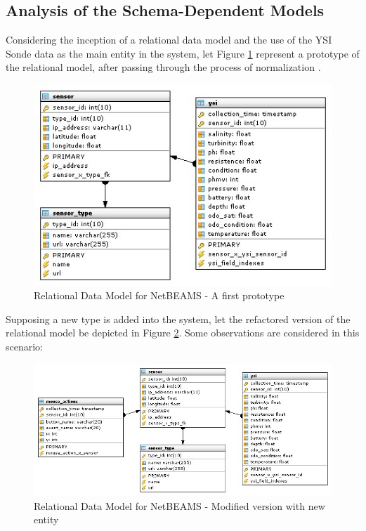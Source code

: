 \subsection{Analysis of the Schema-Dependent Models}

Considering the inception of a relational data model \cite{relational-model}
and the use of the YSI Sonde data as the main entity in the system, let Figure
\ref{fig:Relational-Model-Original} represent a prototype of the relational 
model, after passing through the process of normalization
\cite{db-normalization}.

\begin{figure}
  \centering
  \includegraphics[scale=0.5]{../diagrams/Relational-Model-Original}
  \caption{Relational Data Model for NetBEAMS - A first prototype}
  \label{fig:Relational-Model-Original}
\end{figure}

Supposing a new type is added into the system, let the refactored version of
the relational model be depicted in Figure
\ref{fig:Relational-Model-Addition-Modified}. Some observations are
considered in this scenario:

\begin{figure}
  \centering
  \includegraphics[scale=0.5]{../diagrams/Relational-Model-Addition-Modified}
  \caption{Relational Data Model for NetBEAMS - Modified version with new
  entity}
  \label{fig:Relational-Model-Addition-Modified}
\end{figure}

